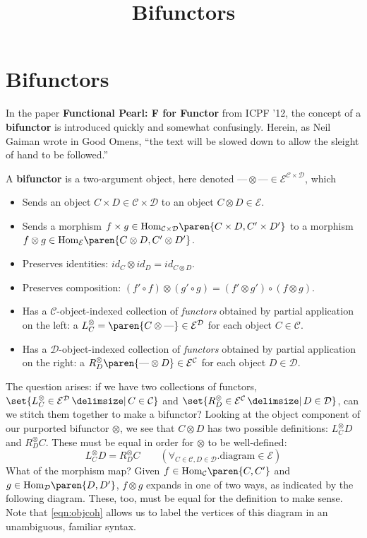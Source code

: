 \documentclass[letterpaper]{article}
\title{Bifunctors}
\DeclareMathOperator{\mmid}{\mathrel{}\mathclose{}\delimsize|\mathopen{}\mathrel{}}
\newcommand{\defn}[1]{{\bf #1}}
\newcommand{\Hom}[3]{\textrm{Hom}_{#1}{\paren{#2,#3}}}
\begin{document}
\section{Bifunctors}

In the paper {\bf Functional Pearl: F for Functor} from ICPF '12, the
concept of a \defn{bifunctor} is introduced quickly and somewhat
confusingly.  Herein, as Neil Gaiman wrote in Good Omens,  ``the text will
be slowed down to allow the sleight of hand to be followed.''

A \defn{bifunctor} is a two-argument object, here denoted $\textrm{---}
\otimes \textrm{---} \in \mathcal{E}^{\mathcal{C} \times \mathcal{D}}$,
which
%
\begin{itemize}
%
  \item Sends an object $C \times D \in \mathcal{C} \times \mathcal{D}$ to
an object $C \otimes D \in \mathcal{E}$.
%
  \item Sends a morphism $f \times g \in \Hom{\mathcal{C} \times
\mathcal{D}}{C \times D}{C' \times D'}$ to a morphism
$f \otimes g \in \Hom{\mathcal{E}}{C \otimes D}{C' \otimes D'}$.
%
  \item Preserves identities: $id_C \otimes id_D = id_{C \otimes D}$.
%
  \item Preserves composition: $(f' \circ f) \otimes (g' \circ g) = (f'
\otimes g') \circ (f \otimes g)$.
%
  \item Has a $\mathcal{C}$-object-indexed collection of {\em functors}
obtained by partial application on the left: a $L^\otimes_C = \paren{C \otimes
\textrm{---}} \in \mathcal{E}^\mathcal{D}$ for each object $C \in
\mathcal{C}$.
%
  \item Has a $\mathcal{D}$-object-indexed collection of {\em functors}
obtained by partial application on the right: a $R^\otimes_D \paren{\textrm{---} \otimes
D} \in \mathcal{E}^\mathcal{C}$ for each object $D \in \mathcal{D}$.
%
\end{itemize}

The question arises: if we have two collections of functors, $\set{
L^\otimes_C \in \mathcal{E}^\mathcal{D} \mmid C \in \mathcal{C}}$ and $\set{
R^\otimes_D \in \mathcal{E}^\mathcal{C} \mmid D \in \mathcal{D}}$, can we
stitch them together to make a bifunctor?  Looking at the object component
of our purported bifunctor $\otimes$, we see that $C \otimes D$ has two
possible definitions: $L^\otimes_C D$ and $R^\otimes_D C$.  These must be
equal in order for $\otimes$ to be well-defined:
%
\begin{equation}\label{eqn:objcoh} L^\otimes_C D = R^\otimes_D C \qquad
(\forall_{C \in \mathcal{C},D \in \mathcal{D}} . \text{diagram} \in
\mathcal{E} ) \end{equation}
%
What of the morphism map?  Given $f \in \Hom{\mathcal{C}}{C}{C'}$ and $g \in
\Hom{\mathcal{D}}{D}{D'}$, $f \otimes g$ expands in one of two ways, as
indicated by the following diagram.  These, too, must be equal for the
definition to make sense.  Note that \autoref{eqn:objcoh} allows us to label
the vertices of this diagram in an unambiguous, familiar syntax.
\end{document}
